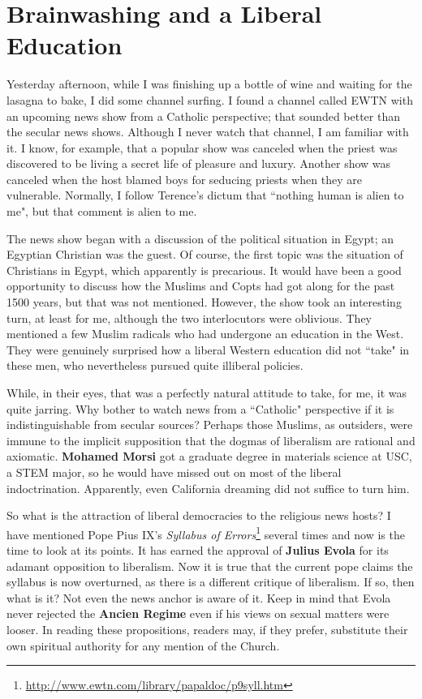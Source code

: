 \section{Brainwashing and a Liberal Education}

Yesterday afternoon, while I was finishing up a bottle of wine and waiting for the lasagna to bake, I did some channel surfing. I found a channel called EWTN with an upcoming news show from a Catholic perspective; that sounded better than the secular news shows. Although I never watch that channel, I am familiar with it. I know, for example, that a popular show was canceled when the priest was discovered to be living a secret life of pleasure and luxury. Another show was canceled when the host blamed boys for seducing priests when they are vulnerable. Normally, I follow Terence's dictum that ``nothing human is alien to me", but that comment is alien to me.

The news show began with a discussion of the political situation in Egypt; an Egyptian Christian was the guest. Of course, the first topic was the situation of Christians in Egypt, which apparently is precarious. It would have been a good opportunity to discuss how the Muslims and Copts had got along for the past 1500 years, but that was not mentioned. However, the show took an interesting turn, at least for me, although the two interlocutors were oblivious. They mentioned a few Muslim radicals who had undergone an education in the West. They were genuinely surprised how a liberal Western education did not ``take" in these men, who nevertheless pursued quite illiberal policies.

While, in their eyes, that was a perfectly natural attitude to take, for me, it was quite jarring. Why bother to watch news from a ``Catholic" perspective if it is indistinguishable from secular sources? Perhaps those Muslims, as outsiders, were immune to the implicit supposition that the dogmas of liberalism are rational and axiomatic. \textbf{Mohamed Morsi} got a graduate degree in materials science at USC, a STEM major, so he would have missed out on most of the liberal indoctrination. Apparently, even California dreaming did not suffice to turn him.

So what is the attraction of liberal democracies to the religious news hosts? I have mentioned Pope Pius IX's \textit{Syllabus of Errors}\footnote{\url{http://www.ewtn.com/library/papaldoc/p9syll.htm}} several times and now is the time to look at its points. It has earned the approval of \textbf{Julius Evola} for its adamant opposition to liberalism. Now it is true that the current pope claims the syllabus is now overturned, as there is a different critique of liberalism. If so, then what is it? Not even the news anchor is aware of it. Keep in mind that Evola never rejected the \textbf{Ancien Regime} even if his views on sexual matters were looser. In reading these propositions, readers may, if they prefer, substitute their own spiritual authority for any mention of the Church.

